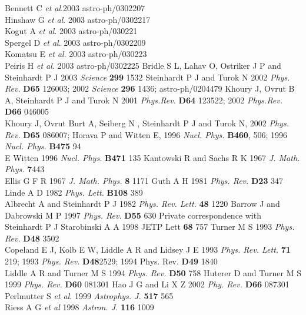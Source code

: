 \documentclass[a4paper,preprint]{revtex4}
\begin{document}
\begin{thebibliography}{99}

 Bennett C \textit{et al}.2003 astro-ph/0302207\\ Hinshaw G \textit{et
al}. 2003 astro-ph/0302217\\ Kogut A \textit{et al}. 2003 astro-ph/030221\\
Spergel D
\textit{et al}. 2003 astro-ph/0302209\\ Komatsu E \textit{et al}. 2003 astro-ph/030223\\
Peiris H \textit{et al}. 2003 astro-ph/0302225
Bridle S L, Lahav O, Ostriker J P and
Steinhardt P J 2003 \textit{Science} \textbf{299} 1532
 Steinhardt P J and Turok N 2002 \textit{Phys. Rev.}
\textbf{D65} 126003; 2002 \textit{Science} \textbf{296} 1436;
astro-ph/0204479
 Khoury J, Ovrut B A, Steinhardt P J and Turok N 2001 \textit{Phys.Rev.}
\textbf{D64} 123522; 2002 \textit{Phys.Rev.} \textbf{D66} 046005\\
Khoury J, Ovrut Burt A, Seiberg N , Steinhardt P J and Turok N,
2002 \textit{Phys. Rev.} \textbf{D65} 086007;
 Horava P and Witten E, 1996 \textit{Nucl. Phys.} \textbf{B460},
506; 1996 \textit{Nucl. Phys.} \textbf{B475} 94\\ E Witten 1996
\textit{Nucl. Phys.} \textbf{B471} 135
 Kantowski R and Sachs R K 1967 \textit{J. Math. Phys.}
\textbf{7}443\\ Ellis G F R 1967 \textit{J. Math. Phys.}
\textbf{8} 1171
 Guth A H 1981 \textit{Phys. Rev.} \textbf{D23}
347\\Linde A D 1982 \textit{Phys. Lett.} \textbf{B108} 389\\
Albrecht A and Steinhardt P J 1982 \textit{Phys. Rev. Lett.}
\textbf{48} 1220
 Barrow J and Dabrowski M P 1997 \textit{Phys. Rev.} \textbf{D55}
630
Private correspondence with Steinhardt P J
Starobinski A A 1998 JETP Lett \textbf{68} 757
 Turner M S 1993 \textit{Phys. Rev.}
\textbf{D48} 3502\\ Copeland E J, Kolb E W, Liddle A R and Lidsey
J E 1993 \textit{Phys. Rev. Lett.} \textbf{71} 219; 1993
\textit{Phys. Rev.} \textbf{D48}2529; 1994 Phys. Rev. \textbf{D49}
1840\\ Liddle A R and Turner M S 1994 \textit{Phys. Rev.}
\textbf{D50} 758
 Huterer D and Turner M S 1999 \textit{Phys. Rev.}
\textbf{D60} 081301
 Hao J G and Li X Z 2002 \textit{Phy. Rev.}
\textbf{D66} 087301
 Perlmutter S \textit{et al}. 1999 \textit{Astrophys. J.} {\bf 517} 565
\\ Riess A G \textit{et al} 1998 \textit{Astron. J.}
{\bf 116} 1009
\end{thebibliography}
\end{document}
